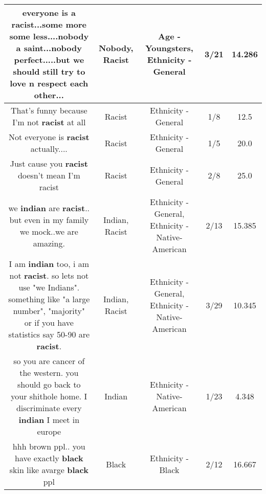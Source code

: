 \documentclass[11pt]{article}
\newlength\mylength
\begin{document}
\begin{center}
\begin{longtable}{|C{.65\mylength}|C{.30\mylength}|C{.12\mylength}|C{.12\mylength}|C{.12\mylength}|}
  \small everyone is a \textbf{racist}...some more some less....\textbf{nobody} a saint...\textbf{nobody} perfect.....but we should still try to love n respect each other...\normalsize   & Nobody, Racist & Age - Youngsters, Ethnicity - General & 3/21 & 14.286 \\  \hline
  \small That's funny because I'm not \textbf{racist} at all\normalsize   & Racist & Ethnicity - General & 1/8 & 12.5 \\  \hline
  \small Not everyone is \textbf{racist} actually....\normalsize   & Racist & Ethnicity - General & 1/5 & 20.0 \\  \hline
  \small Just cause you \textbf{racist} doesn't mean I'm racist\normalsize   & Racist & Ethnicity - General & 2/8 & 25.0 \\  \hline
  \small we \textbf{indian} are \textbf{racist}.. but even in my family we mock..we are amazing.\normalsize   & Indian, Racist & Ethnicity - General, Ethnicity - Native-American & 2/13 & 15.385 \\  \hline
  \small I am \textbf{indian} too, i am not \textbf{racist}. so lets not use "we Indians". something like "a large number", "majority" or if you have statistics say 50-90 are \textbf{racist}.\normalsize   & Indian, Racist & Ethnicity - General, Ethnicity - Native-American & 3/29 & 10.345 \\  \hline
  \small so you are cancer of the western. you should go back to your shithole home. I discriminate every \textbf{indian} I meet in europe\normalsize   & Indian & Ethnicity - Native-American & 1/23 & 4.348 \\  \hline
  \small hhh brown ppl.. you have exactly \textbf{black} skin like avarge \textbf{black} ppl\normalsize   & Black & Ethnicity - Black & 2/12 & 16.667 \\  \hline

\end{longtable}
\end{center}
\end{document}
